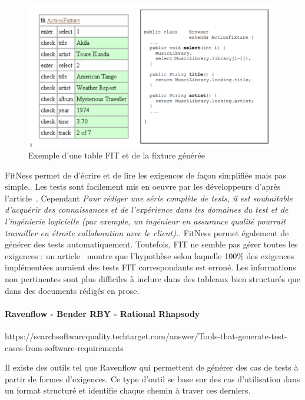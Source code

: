             \begin{figure}[H]
                \centering
                \includegraphics[width=\textwidth]{images/FIT.png}
                \caption{Exemple d'une table FIT et de la fixture générée}
            \end{figure}

        FitNess permet de d'écrire et de lire les exigences de façon simplifiée mais pas simple.. Les tests sont facilement mis en oeuvre par les développeurs d'après l'article~\cite{article6}. Cependant \textit{\guillemotleft Pour rédiger une série complète de tests, il est souhaitable d'acquérir des connaissances et de l'expérience dans les domaines du test et de l'ingénierie logicielle (par exemple, un ingénieur en assurance qualité pourrait travailler en étroite collaboration avec le client).\guillemotright}. FitNess permet également de générer des tests automatiquement. Toutefois, FIT ne semble pas gérer toutes les exigences : un article~\cite{article6} montre que l'hypothèse selon laquelle 100\% des exigences implémentées auraient des tests FIT correspondants est erroné. Les informations non pertinentes sont plus difficiles à inclure dans des tableaux bien structurés que dans des documents rédigés en prose.
         

        
        \paragraph{Ravenflow - Bender RBY - Rational Rhapsody }
        https://searchsoftwarequality.techtarget.com/answer/Tools-that-generate-test-cases-from-software-requirements
        
        Il existe des outils tel que Ravenflow qui permettent de générer des cas de tests à partir de formes d'exigences. Ce type d'outil se base sur des cas d'utilisation dans un format structuré et identifie chaque chemin à traver ces derniers. 
        
